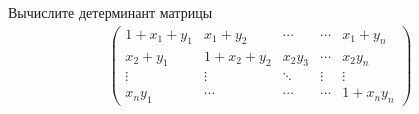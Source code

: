 \begin{prb}
    Вычислите детерминант матрицы
    \begin{gather*}
        \left(
        \begin{array}{ccccc}
            1 + x_{1}  + y_{1} &  x_{1} +  y_{2} & \cdots & \cdots &x_{1} + y_{n}\\
           x_{2}  + y_{1}  &   1 + x_{2} + y_{2} & x_{2} y_{3} & \cdots & x_{2} y_{n}\\
           \vdots & \vdots & \ddots& \vdots & \vdots\\
           x_{n} y_{1} & \cdots & \cdots & \cdots & 1 + x_{n} y_{n}
        \end{array}
        \right)
    \end{gather*}
\end{prb}   

